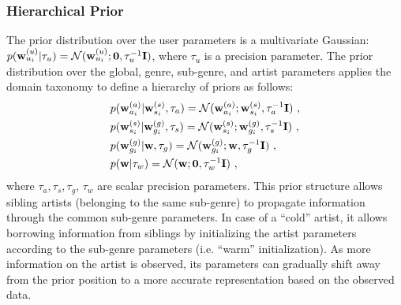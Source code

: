 \subsubsection{Hierarchical Prior}
The prior distribution over the user parameters is a multivariate Gaussian:
$p(\mathbf{w}^{(u)}_{u_i} | \tau_u) = \mathcal{N}(\mathbf{w}^{(u)}_{u_i} ; \mathbf{0}, \tau_u^{-1}\mathbf{I} )$, where $\tau_u$ is a precision parameter.
The prior distribution over the global, genre, sub-genre, and artist parameters applies the domain taxonomy to define a hierarchy of priors as follows:
\begin{align}
&p(\mathbf{w}^{(a)}_{a_i} | \mathbf{w}^{(s)}_{s_i}, \tau_a )  = \mathcal{N} (\mathbf{w}^{(a)}_{a_i}; \mathbf{w}^{(s)}_{s_i}, \tau_a^{-1}\mathbf{I} ) \ , \nonumber \\
&p(\mathbf{w}^{(s)}_{s_i} | \mathbf{w}^{(g)}_{g_i}, \tau_s)   = \mathcal{N} (\mathbf{w}^{(s)}_{s_i}; \mathbf{w}^{(g)}_{g_i}, \tau_s^{-1}\mathbf{I} ) \ , \nonumber \\
&p(\mathbf{w}^{(g)}_{g_i} | \mathbf{w}, \tau_g )              = \mathcal{N} (\mathbf{w}^{(g)}_{g_i}; \mathbf{w}, \tau_g^{-1}\mathbf{I} )             \ , \nonumber \\
&p(\mathbf{w} | \tau_w)                               = \mathcal{N} (\mathbf{w}; \mathbf{0}, \tau_w^{-1}\mathbf{I} ) \ ,
\end{align}
where $\tau_a, \tau_s, \tau_g$, $\tau_w$ are scalar precision parameters.
This prior structure allows sibling artists (belonging to the same sub-genre) to propagate information through the common sub-genre parameters. 
In case of a ``cold'' artist, it allows borrowing information from siblings by initializing the artist parameters according to the sub-genre parameters (i.e. ``warm'' initialization). As more information on the artist is observed, its parameters can gradually shift away from the prior position to a more accurate representation based on the observed data.
